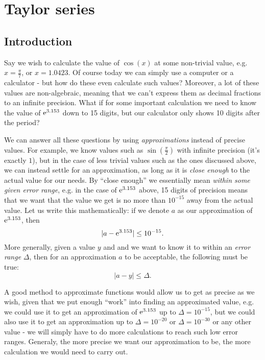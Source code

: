 \section{Taylor series}
\subsection{Introduction}
Say we wish to calculate the value of $\cos(x)$ at some non-trivial value, e.g. $x=\frac{\pi}{7}$, or $x=1.0423$. Of course today we can simply use a computer or a calculator - but how do these even calculate such values? Moreover, a lot of these values are non-algebraic, meaning that we can't express them as decimal fractions to an infinite precision. What if for some important calculation we need to know the value of $\mathrm{e}^{3.153}$ down to 15 digits, but our calculator only shows 10 digits after the period?

We can answer all these questions by using \emph{approximations} instead of precise values. For example, we know values such as $\sin\left(\frac{\pi}{2}\right)$ with infinite precision (it's exactly $1$), but in the case of less trivial values such as the ones discussed above, we can instead settle for an approximation, as long as it is \textit{close enough} to the actual value for our needs. By ``close enough'' we essentially mean \textit{within some given error range}, e.g. in the case of $\mathrm{e}^{3.153}$ above, 15 digits of precision means that we want that the value we get is no more than $10^{-15}$ away from the actual value. Let us write this mathematically: if we denote $a$ as our approximation of $\mathrm{e}^{3.153}$, then
\[
  \lvert a-\mathrm{e}^{3.153}\rvert \leq 10^{-15}.
\]
More generally, given a value $y$ and and we want to know it to within an \emph{error range} $\Delta$, then for an approximation $a$ to be acceptable, the following must be true:
\begin{equation}
  \lvert a-y \rvert \leq \Delta.
  \label{eq:error_range}
\end{equation}

A good method to approximate functions would allow us to get as precise as we wish, given that we put enough ``work'' into finding an approximated value, e.g. we could use it to get an approximation of $\mathrm{e}^{3.153}$ up to $\Delta=10^{-15}$, but we could also use it to get an approximation up to $\Delta=10^{-20}$ or $\Delta=10^{-30}$ or any other value - we will simply have to do more calculations to reach such low error ranges. Generaly, the more precise we want our approximation to be, the more calculation we would need to carry out.

